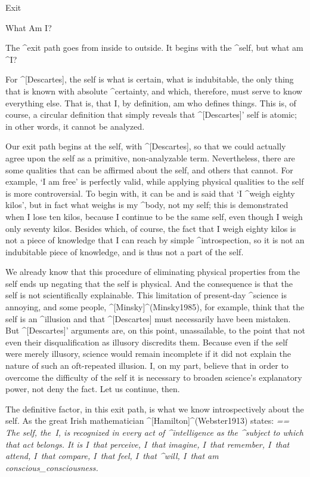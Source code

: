 
\Part Exit

\Section What Am I?

The ^{exit path} goes from inside to outside. It begins with the
^{self}, but what am ^{I}?

For ^[Descartes], the self is what is certain, what is indubitable, the
only thing that is known with absolute ^{certainty}, and which,
therefore, must serve to know everything else. That is, that I, by
definition, am who defines things. This is, of course, a circular
definition that simply reveals that ^[Descartes]' self is atomic; in
other words, it cannot be analyzed.

Our exit path begins at the self, with ^[Descartes], so that we could
actually agree upon the self as a primitive, non-analyzable term.
Nevertheless, there are some qualities that can be affirmed about the
self, and others that cannot. For example, `I am free' is perfectly
valid, while applying physical qualities to the self is more
controversial. To begin with, it can be and is said that `I ^{weigh}
eighty kilos', but in fact what weighs is my ^{body}, not my self; this
is demonstrated when I lose ten kilos, because I continue to be the same
self, even though I weigh only seventy kilos. Besides which, of course,
the fact that I weigh eighty kilos is not a piece of knowledge that I
can reach by simple ^{introspection}, so it is not an indubitable piece
of knowledge, and is thus not a part of the self.

We already know that this procedure of eliminating physical properties
from the self ends up negating that the self is physical. And the
consequence is that the self is not scientifically explainable. This
limitation of present-day ^{science} is annoying, and some people,
^[Minsky]^(Minsky1985), for example, think that the self is an
^{illusion} and that ^[Descartes] must necessarily have been mistaken.
But ^[Descartes]' arguments are, on this point, unassailable, to the
point that not even their disqualification as illusory discredits them.
Because even if the self were merely illusory, science would remain
incomplete if it did not explain the nature of such an oft-repeated
illusion. I, on my part, believe that in order to overcome the
difficulty of the self it is necessary to broaden science's explanatory
power, not deny the fact. Let us continue, then.

The definitive factor, in this exit path, is what we know
introspectively about the self. As the great Irish mathematician
^[Hamilton]^(Webster1913) states:
\beginpoints \sl\leftskip=\parindent \rightskip=\parindent \noindent
The self, the~I, is recognized in every act of ^{intelligence} as the
^{subject} to which that act belongs. It is I~that perceive, I~that
imagine, I~that remember, I~that attend, I~that compare, I~that feel,
I~that ^{will}, I~that am conscious_{consciousness}.
\endpoints

